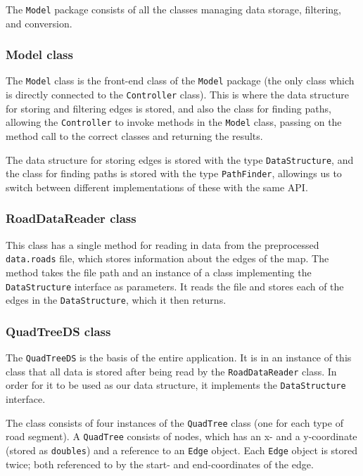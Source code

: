 The \texttt{Model} package consists of all the classes managing data storage, filtering, and conversion.

\subsubsection{Model class} %
The \texttt{Model} class is the front-end class of the \texttt{Model} package (the only class which is directly connected to the \texttt{Controller} class). This is where the data structure for storing and filtering edges is stored, and also the class for finding paths, allowing the \texttt{Controller} to invoke methods in the \texttt{Model} class, passing on the method call to the correct classes and returning the results.

The data structure for storing edges is stored with the type \texttt{DataStructure}, and the class for finding paths is stored with the type \texttt{PathFinder}, allowings us to switch between different implementations of these with the same API.

\subsubsection{RoadDataReader class}
This class has a single method for reading in data from the preprocessed \texttt{data.roads} file, which stores information about the edges of the map. The method takes the file path and an instance of a class implementing the \texttt{DataStructure} interface as parameters. It reads the file and stores each of the edges in the \texttt{DataStructure}, which it then returns.

\subsubsection{QuadTreeDS class} %
The \texttt{QuadTreeDS} is the basis of the entire application. It is in an instance of this class that all data is stored after being read by the \texttt{RoadDataReader} class. In order for it to be used as our data structure, it implements the \texttt{DataStructure} interface.

The class consists of four instances of the \texttt{QuadTree} class (one for each type of road segment). A \texttt{QuadTree} consists of nodes, which has an x- and a y-coordinate (stored as \texttt{doubles}) and a reference to an \texttt{Edge} object. Each \texttt{Edge} object is stored twice; both referenced to by the start- and end-coordinates of the edge.

